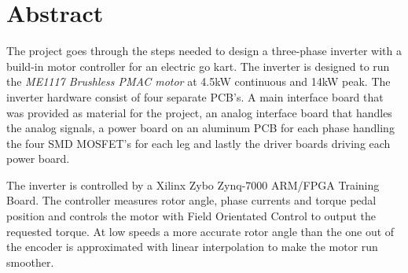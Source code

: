 \section{Abstract}
The project goes through the steps needed to design a three-phase inverter with a build-in motor controller for an electric go kart.
The inverter is designed to run the \textit{ME1117 Brushless PMAC motor} at 4.5kW continuous and 14kW peak. The inverter hardware consist of four separate PCB's. A main interface board that was provided as material for the project, an analog interface board that handles the analog signals, a power board on an aluminum PCB for each phase handling the four SMD MOSFET's for each leg and lastly the driver boards driving each power board. 

The inverter is controlled by a Xilinx Zybo Zynq-7000 ARM/FPGA Training Board. The controller measures rotor angle, phase currents and torque pedal position and controls the motor with Field Orientated Control to output the requested torque. 
At low speeds a more accurate rotor angle than the one out of the encoder is approximated with linear interpolation to make the motor run smoother.

